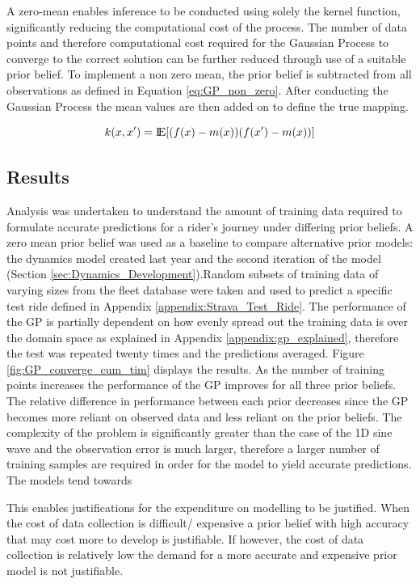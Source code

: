 \documentclass[a4paper, 10pt]{article}
\numberwithin{equation}{section}
\begin{document}
A zero-mean enables inference to be conducted using solely the kernel function, significantly reducing the computational cost of the process. The number of data points and therefore computational cost required for the Gaussian Process to converge to the correct solution can be further reduced through use of a suitable prior belief. To implement a non zero mean, the prior belief is subtracted from all observations as defined in Equation \ref{eq:GP_non_zero}. After conducting the Gaussian Process the mean values are then added on to define the true mapping.

\begin{equation}
    \label{eq:GP_non_zero}
    k(x,x')= {\rm I\!E}[(f(x) - m(x))(f(x') - m(x))]
\end{equation}



\subsection{Results}


Analysis was undertaken to understand the amount of training data required to formulate accurate predictions for a rider's journey under differing prior beliefs. A zero mean prior belief was used as a baseline to compare alternative prior models: the dynamics model created last year \cite{report:dynamics} and the second iteration of the model (Section \ref{sec:Dynamics_Development}).Random subsets of training data of varying sizes from the fleet database were taken and used to predict a specific test ride defined in Appendix \ref{appendix:Strava_Test_Ride}. The performance of the GP is partially dependent on how evenly spread out the training data is over the domain space as explained in Appendix \ref{appendix:gp_explained}, therefore the test was repeated twenty times and the predictions averaged. Figure \ref{fig:GP_converge_cum_tim} displays the results. As the number of training points increases the performance of the GP improves for all three prior beliefs. The relative difference in performance between each prior decreases since the GP becomes more reliant on observed data and less reliant on the prior beliefs. The complexity of the problem is significantly greater than the case of the 1D sine wave and the observation error is much larger, therefore a larger number of training samples are required in order for the model to yield accurate predictions. The models tend towards 

This enables justifications for the expenditure on modelling to be justified. When the cost of data collection is difficult/ expensive a prior belief with high accuracy that may cost more to develop is justifiable. If however, the cost of data collection is relatively low the demand for a more accurate and expensive prior model is not justifiable.  
\end{document}
